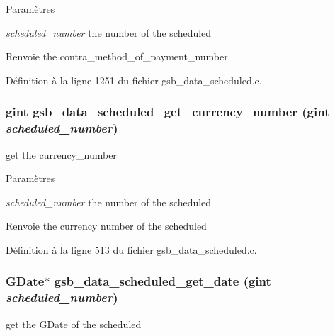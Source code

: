 \begin{DoxyParams}{Paramètres}
\item[{\em scheduled\_\-number}]the number of the scheduled\end{DoxyParams}
\begin{DoxyReturn}{Renvoie}
the contra\_\-method\_\-of\_\-payment\_\-number 
\end{DoxyReturn}


Définition à la ligne 1251 du fichier gsb\_\-data\_\-scheduled.c.

\subsubsection[{gsb\_\-data\_\-scheduled\_\-get\_\-currency\_\-number}]{\setlength{\rightskip}{0pt plus 5cm}gint gsb\_\-data\_\-scheduled\_\-get\_\-currency\_\-number (gint {\em scheduled\_\-number})}\label{gsb__data__scheduled_8c_ae2e1360e9ff4b1ba96bb241cbe55db25}
get the currency\_\-number


\begin{DoxyParams}{Paramètres}
\item[{\em scheduled\_\-number}]the number of the scheduled\end{DoxyParams}
\begin{DoxyReturn}{Renvoie}
the currency number of the scheduled 
\end{DoxyReturn}


Définition à la ligne 513 du fichier gsb\_\-data\_\-scheduled.c.

\subsubsection[{gsb\_\-data\_\-scheduled\_\-get\_\-date}]{\setlength{\rightskip}{0pt plus 5cm}GDate$\ast$ gsb\_\-data\_\-scheduled\_\-get\_\-date (gint {\em scheduled\_\-number})}\label{gsb__data__scheduled_8c_ae4e987a3bddc7f5550d91fae634d6dee}
get the GDate of the scheduled


